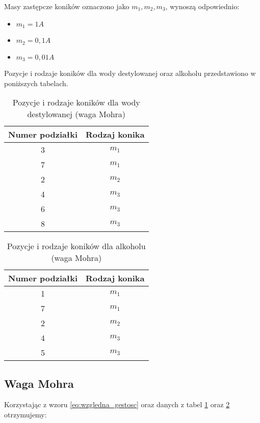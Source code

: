\documentclass[a4paper,12pt]{article}
\begin{document}
Masy zastępcze koników oznaczono jako $m_1, m_2, m_3$, wynoszą odpowiednio:

\begin{itemize}
    \item $m_1 = 1A$
    \item $m_2 = 0{,}1 A$
    \item $m_3 = 0{,}01 A$
\end{itemize}

Pozycje i rodzaje koników dla wody destylowanej oraz alkoholu przedstawiono w poniższych tabelach.

\begin{table}[H]
    \centering
    \begin{tabular}{|c|c|}
        \hline
        Numer podziałki & Rodzaj konika \\
        \hline
        3 & $m_1$ \\
        7 & $m_1$ \\
        2 & $m_2$ \\
        4 & $m_3$ \\
        6 & $m_3$ \\
        8 & $m_3$ \\
        \hline
    \end{tabular}
    \caption{Pozycje i rodzaje koników dla wody destylowanej (waga Mohra)}
    \label{tab:waga_mohra_woda}
\end{table}

\begin{table}[H]
    \centering
    \begin{tabular}{|c|c|}
        \hline
        Numer podziałki & Rodzaj konika \\
        \hline
        1 & $m_1$ \\
        7 & $m_1$ \\
        2 & $m_2$ \\
        4 & $m_3$ \\
        5 & $m_3$ \\
        \hline
    \end{tabular}
    \caption{Pozycje i rodzaje koników dla alkoholu (waga Mohra)}
    \label{tab:waga_mohra_alkohol}
\end{table}


\subsection{Waga Mohra}


Korzystając z wzoru \ref{eq:wzgledna_gestosc} oraz danych z tabel \ref{tab:waga_mohra_woda} oraz \ref{tab:waga_mohra_alkohol} otrzymujemy:
\end{document}
